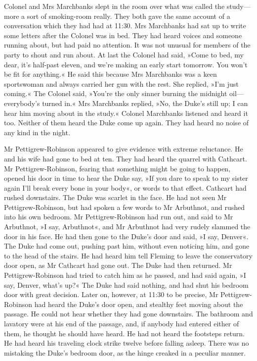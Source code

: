 Colonel and Mrs Marchbanks slept in the room over what was called the study\allowbreak---\allowbreak more a sort of smoking-room really. They both gave the same account of a conversation which they had had at 11:30. Mrs Marchbanks had sat up to write some letters after the Colonel was in bed. They had heard voices and someone running about, but had paid no attention.  It was not unusual for members of the party to shout and run about.  At last the Colonel had said, »Come to bed, my dear, it's half-past eleven, and we're making an early start tomorrow. You won't be fit for anything.« He said this because Mrs Marchbanks was a keen sportswoman and always carried her gun with the rest. She replied, »I'm just coming.« The Colonel said, »You're the only sinner burning the midnight oil\allowbreak---\allowbreak everybody's turned in.« Mrs Marchbanks replied, »No, the Duke's still up; I can hear him moving about in the study.« Colonel Marchbanks listened and heard it too. Neither of them heard the Duke come up again. They had heard no noise of any kind in the night.

Mr Pettigrew-Robinson appeared to give evidence with extreme reluctance. He and his wife had gone to bed at ten. They had heard the quarrel with Cathcart. Mr Pettigrew-Robinson, fearing that something might be going to happen, opened his door in time to hear the Duke say, »If you dare to speak to my sister again I'll break every bone in your body«, or words to that effect. Cathcart had rushed downstairs. The Duke was scarlet in the face. He had not seen Mr  Pettigrew-Robinson, but had spoken a few words to Mr Arbuthnot, and rushed into his own bedroom. Mr Pettigrew-Robinson had run out, and said to Mr Arbuthnot, »I say, Arbuthnot«, and Mr Arbuthnot had very rudely slammed the door in his face. He had then gone to the Duke's door and said, »I say, Denver«. The Duke had come out, pushing past him, without even noticing him, and gone to the head of the stairs. He had heard him tell Fleming to leave the conservatory door open, as Mr Cathcart had gone out. The Duke had then returned. Mr  Pettigrew-Robinson had tried to catch him as he passed, and had said again, »I say, Denver, what's up?« The Duke had said nothing, and had shut his bedroom door with great decision. Later on, however, at 11:30 to be precise, Mr Pettigrew-Robinson had heard the Duke's door open, and stealthy feet moving about the passage. He could not hear whether they had gone downstairs. The bathroom and lavatory were at his end of the passage, and, if anybody had entered either of them, he thought he should have heard. He had not heard the footsteps return. He had heard his traveling clock strike twelve before falling asleep. There was no mistaking the Duke's bedroom door, as the hinge creaked in a peculiar manner.

